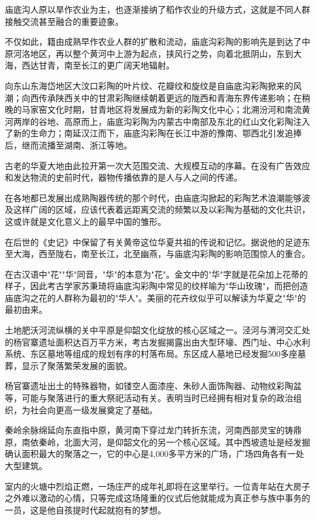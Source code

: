 庙底沟人原以旱作农业为主，也逐渐接纳了稻作农业的升级方式，这就是不同人群接触交流甚至融合的重要迹象。

不仅如此，籍由成熟早作农业人群的扩散和流动，庙底沟彩陶的影响先是到达了中原河洛地区，再以整个黄河中上游为起点，挟风行之势，向着北抵阴山，东到大海，西达甘青，南至长江的更广阔天地辐射。

向东山东海岱地区大汶口彩陶的叶片纹、花瓣纹和旋纹是自庙底沟彩陶掀来的风潮；向西传承陕西关中的甘肃彩陶继续朝着更远的陇西和青海东界传递影响；在稍晚的马家窑文化时期，甘青地区将发展成为新的彩陶文化中心；北溯汾河和南流黄河两岸的谷地、高原而上，庙底沟彩陶为内蒙古中南部及东北的红山文化彩陶注入了新的生命力；南延汉江而下，庙底沟彩陶在长江中游的豫南、鄂西北引发追捧后，继而流播至湖南、浙江等地。

古老的华夏大地由此拉开第一次大范围交流、大规模互动的序幕。在没有广告效应和发达物流的史前时代，器物传播依靠的是人与人之间的传递。

在各地都已发展出成熟陶器传统的那个时代，由庙底沟掀起的彩陶艺术浪潮能够波及这样广阔的区域，应该代表着远距离交流的频繁以及以彩陶为基础的文化共识，这或许就是文化意义上的最早中国的雏形。

在后世的《史记》中保留了有关黄帝这位华夏共祖的传说和记忆。据说他的足迹东至大海，西至陇右，南至长江，北至幽燕，与庙底沟彩陶的影响范围惊人的重合。

在古汉语中"花""华"同音，"华"的本意为"花"。金文中的"华"字就是花朵加上花蒂的样子，因此考古学家苏秉琦将庙底沟彩陶中常见的纹样喻为"华山玫瑰"，而把创造庙底沟之花的人群称为最初的"华人"。美丽的花卉纹似乎可以解读为华夏之"华"的最初由来。

土地肥沃河流纵横的关中平原是仰韶文化绽放的核心区域之一。泾河与渭河交汇处的杨官寨遗址面积达百万平方米，考古发掘揭露出由大型环壕、西门址、中心水利系统、东区墓地等组成的规划有序的村落布局。东区成人墓地已经发掘500多座墓葬，显示了聚落繁荣发展的面貌。

杨官寨遗址出土的特殊器物，如镂空人面漆座、朱砂人面饰陶器、动物纹彩陶盆等，可能与聚落进行的重大祭祀活动有关。表明当时已经拥有相对复杂的政治组织，为社会向更高一级发展奠定了基础。

秦岭余脉绵延向东直指中原，黄河南下穿过龙门转折东流，河南西部灵宝的铸鼎原，南依秦岭，北面大河，是仰韶文化的另一个核心区域。其中西坡遗址是经发掘确认面积最大的聚落之一，它的中心是4,000多平方米的广场，广场四角各有一处大型建筑。

室内的火塘中烈焰正燃，一场庄严的成年礼即将在这里举行。一位青年站在大房子之外难以激动的心情，只等完成这场隆重的仪式后他就能成为真正参与族中事务的一员，这是他自孩提时代起就抱有的梦想。

